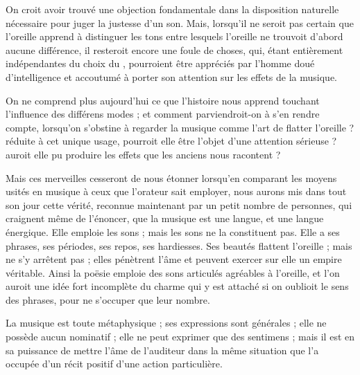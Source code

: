 \documentclass[11pt,a4paper]{article}
\begin{document}
On croit avoir trouvé une objection fondamentale dans la disposition
naturelle nécessaire pour juger la justesse d'un son. Mais, lorsqu'il ne
seroit pas certain que l'oreille apprend à distinguer les tons entre
lesquels l'oreille ne trouvoit d'abord aucune différence, il resteroit
encore une foule de choses, qui, étant entièrement indépendantes du
choix du , pourroient être appréciés par l'homme doué
d'intelligence et accoutumé à porter son attention sur les effets de la
musique.


On ne comprend plus aujourd'hui ce que l'histoire nous apprend touchant
l'influence des différens modes ; et comment parviendroit-on à s'en
rendre compte, lorsqu'on s'obstine à regarder la musique comme l'art de
flatter l'oreille ? réduite à cet unique usage, pourroit elle
 être l'objet d'une attention sérieuse ? auroit elle
pu produire les effets  que les anciens nous racontent ?

Mais ces merveilles cesseront de nous étonner lorsqu'en comparant les
moyens usités en musique à ceux que l'orateur sait employer, nous aurons
mis dans tout son jour cette vérité, reconnue maintenant par un petit
nombre de personnes, qui craignent même de l'énoncer, que la musique est
une langue, et une langue énergique. Elle emploie les sons ; mais les
sons ne la constituent pas. Elle a ses phrases, ses périodes, ses repos,
ses hardiesses. Ses beautés flattent l'oreille ;  mais
 ne s'y arrêtent pas ; elles pénètrent l'âme et peuvent
exercer sur elle un empire véritable. Ainsi la poësie emploie des
 sons articulés agréables à l'oreille, et l'on auroit
une idée fort incomplète du charme qui y est attaché si on oublioit le
sens des phrases, pour ne  s'occuper que
 leur nombre.

La musique est toute métaphysique ; ses expressions sont générales ; elle
ne possède aucun nominatif ; elle ne peut exprimer que des sentimens ;
mais il est en sa puissance de mettre l'âme de l'auditeur dans la même
situation que  l'a occupée d'un récit positif d'une
action particulière.
\end{document}
